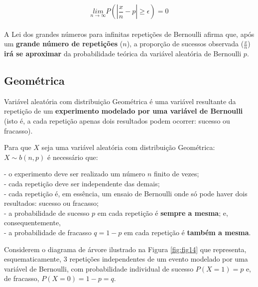 \documentclass[
]{book}
\begin{document}
\hfill\break

\[
\underset{n\to \infty }{lim}P\left(\left|\frac{x}{n}-p\right|\ge \epsilon \right)=0
\]\\

A Lei dos grandes números para infinitas repetições de Bernoulli afirma que, após um \textbf{grande número de repetições} (\(n\)), a proporção de sucessos observada (\(\frac{x}{n}\)) \textbf{irá se aproximar} da probabilidade teórica da variável aleatória de Bernoulli \(p\).

\hypertarget{geomuxe9trica}{%
\subsection{Geométrica}\label{geomuxe9trica}}

Variável aleatória com distribuição Geométrica é uma variável resultante da repetição de um \textbf{experimento modelado por uma variável de Bernoulli} (isto é, a cada repetição apenas dois resultados podem ocorrer: sucesso ou fracasso).

\hfill\break

Para que \(X\) seja uma variável aleatória com distribuição Geométrica: \(X\sim b(n,p)\) é necessário que:

\hfill\break
- o experimento deve ser realizado um número \(n\) finito de vezes;\\
- cada repetição deve ser independente das demais;\\
- cada repetição é, em essência, um ensaio de Bernoulli onde só pode haver dois resultados: sucesso ou fracasso;\\
- a probabilidade de sucesso \(p\) em cada repetição é \textbf{sempre a mesma}; e, consequentemente,\\
- a probabilidade de fracasso \(q=1-p\) em cada repetição é \textbf{também a mesma}.

\hfill\break

Considerem o diagrama de árvore ilustrado na Figura \ref{fig:fig14} que representa, esquematicamente, 3 repetições independentes de um evento modelado por uma variável de Bernoulli, com probabilidade individual de sucesso \(P(X=1)=p\) e, de fracasso, \(P(X=0)=1-p=q\).

\hfill\break
\end{document}
